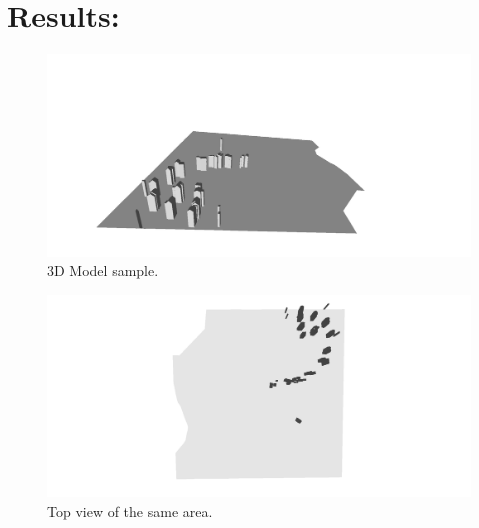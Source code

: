 \documentclass[a4paper, 11pt]{article}
\begin{document}
	\section*{Results:}
	\begin{figure}[H]
		\begin{center}
			\caption{\label{img::snap} 3D Model sample.}
			\includegraphics[scale=.3]{images/raster/elancourt/snapshot_100.png}
		\end{center}
	\end{figure}
	
	\begin{figure}[H]
		\begin{center}
			\caption{\label{img::snap_top} Top view of the same area.}
			\includegraphics[scale=.35]{images/raster/elancourt/snapshot_top01.png}
		\end{center}
	\end{figure}
	
\end{document}
